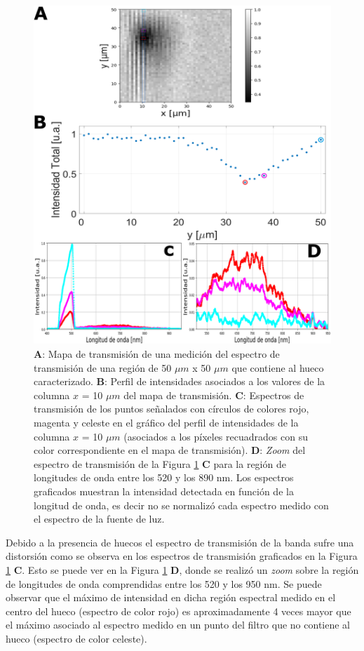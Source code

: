  \begin{figure}[H]
	\centering
	\includegraphics[scale=0.3]{Figs/microespectrometro/huecotranscondetalles.png}
	\caption{\textbf{A}: Mapa de transmisión de una medición del espectro de transmisión de una región de 50 $\mu m$ x 50 $\mu m$ que contiene al hueco caracterizado.  \textbf{B}: Perfil de intensidades asociados a los valores de la columna $\textit{x}$ = 10 $\mu m$ del mapa de transmisión. \textbf{C}: Espectros de transmisión de los puntos señalados con círculos de colores rojo, magenta y celeste en el gráfico del perfil de intensidades de la columna $\textit{x}$ = 10 $\mu m$ (asociados a los píxeles recuadrados con su color correspondiente en el mapa de transmisión). \textbf{D}: \textit{Zoom} del espectro de transmisión de la Figura \ref{fig:huecotr} \textbf{C} para la región de longitudes de onda entre los 520 y los 890 nm. Los espectros graficados muestran la intensidad detectada en función de la longitud de onda, es decir no se normalizó cada espectro medido con el espectro de la fuente de luz.}
	\label{fig:huecotr}
\end{figure}

Debido a la presencia de huecos el espectro de transmisión de la banda sufre una distorsión como se observa en los espectros de transmisión graficados en la Figura \ref{fig:huecotr} \textbf{C}. Esto se puede ver en la Figura \ref{fig:huecotr} \textbf{D}, donde se realizó un \textit{zoom} sobre la región de longitudes de onda comprendidas entre los 520 y los 950 nm. Se puede observar que el máximo de intensidad en dicha región espectral medido en el centro del hueco (espectro de color rojo) es aproximadamente 4 veces mayor que el máximo asociado al espectro medido en un punto del filtro que no contiene al hueco (espectro de color celeste).

